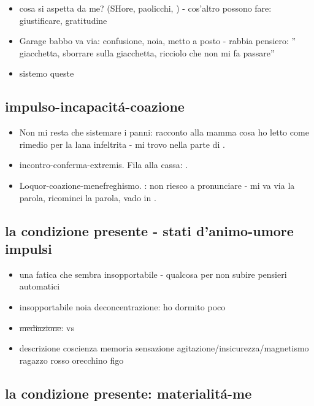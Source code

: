 \begin{itemize}
\item cosa si aspetta da me? (SHore, paolicchi, ) - cos'altro possono fare: giustificare, gratitudine
\item Garage babbo va via: confusione, noia, metto a posto - rabbia pensiero: '' giacchetta, sborrare sulla giacchetta, ricciolo che non mi fa passare''
\item sistemo queste
\end{itemize}

\subsection{impulso-incapacit\'a-coazione}

\begin{itemize}
\item Non mi resta che sistemare i panni: racconto alla mamma cosa ho letto come rimedio per la lana infeltrita - mi trovo nella parte di .
\item incontro-conferma-extremis. Fila alla cassa: .
\item Loquor-coazione-menefreghismo. : non riesco a pronunciare - mi va via la parola, ricominci la parola, vado in .
\end{itemize}

\subsection{la condizione presente - stati d'animo-umore impulsi}

\begin{itemize}
\item una fatica che sembra insopportabile - qualcosa per non subire pensieri automatici
\item insopportabile noia deconcentrazione: ho dormito poco
\item \sout{mediazione}:  vs 
\item descrizione coscienza memoria sensazione agitazione/insicurezza/magnetismo ragazzo rosso orecchino figo
\end{itemize}

\subsection{la condizione presente: materialit\'a-me}

